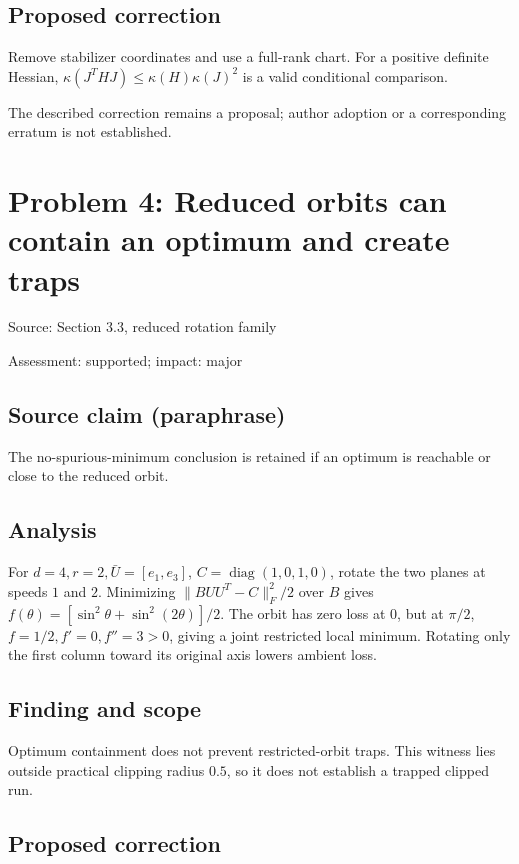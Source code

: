 \documentclass[11pt]{article}
\begin{document}
\subsection*{Proposed correction}

Remove stabilizer coordinates and use a full-rank chart. For a positive definite Hessian, \(\kappa(J^THJ)\le\kappa(H)\kappa(J)^2\) is a valid conditional comparison.

The described correction remains a proposal; author adoption or a corresponding erratum is not established.

\section*{Problem 4: Reduced orbits can contain an optimum and create traps}

Source: Section 3.3, reduced rotation family

Assessment: supported; impact: major

\subsection*{Source claim (paraphrase)}

The no-spurious-minimum conclusion is retained if an optimum is reachable or close to the reduced orbit.

\subsection*{Analysis}

For \(d=4,r=2,\bar U=[e_1,e_3]\), \(C=\operatorname{diag}(1,0,1,0)\), rotate the two planes at speeds \(1\) and \(2\). Minimizing \(\|BUU^T-C\|_F^2/2\) over \(B\) gives \(f(\theta)=[\sin^2\theta+\sin^2(2\theta)]/2\). The orbit has zero loss at \(0\), but at \(\pi/2\), \(f=1/2,f'=0,f''=3>0\), giving a joint restricted local minimum. Rotating only the first column toward its original axis lowers ambient loss.

\subsection*{Finding and scope}

Optimum containment does not prevent restricted-orbit traps. This witness lies outside practical clipping radius \(0.5\), so it does not establish a trapped clipped run.

\subsection*{Proposed correction}
\end{document}
